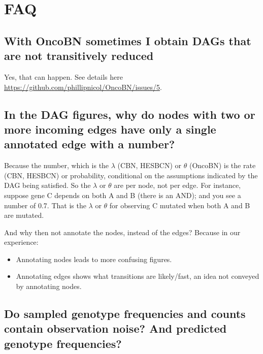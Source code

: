 \documentclass[a4paper,11pt]{article}
\begin{document}

    







\section{FAQ}
\label{sec:faq}

\subsection{With OncoBN sometimes I obtain DAGs that are not transitively reduced}

Yes, that can happen. See details here \url{https://github.com/phillipnicol/OncoBN/issues/5}.


\subsection{In the DAG figures, why do nodes with two or more incoming edges have only a single annotated edge with a number?}
\label{faq-single-num}

Because the number, which is the $\lambda$ (CBN, HESBCN) or $\theta$ (OncoBN) is the rate (CBN, HESBCN) or probability, conditional on the assumptions indicated by the DAG being satisfied. So the $\lambda$ or $\theta$ are per node, not per edge. For instance, suppose gene C depends on both A and B (there is an AND); and you see a number of 0.7. That is the $\lambda$ or $\theta$ for observing C mutated when both A and B are mutated. 


And why then not annotate the nodes, instead of the edges? Because in our experience:
\begin{itemize}
\item Annotating nodes leads to more confusing figures.
\item Annotating edges shows what transitions are likely/fast, an idea not conveyed by annotating nodes.
\end{itemize}



\subsection{Do sampled genotype frequencies and counts contain observation noise? And predicted genotype frequencies?}
\label{sec:do-sampled-genotype}
\end{document}
